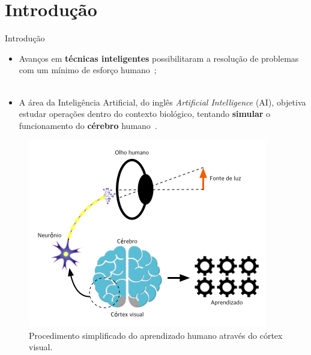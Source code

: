 \section{Introdução}
\label{s.introduction}

\begin{frame}{Introdução}
	\begin{itemize}
		\justifying
		\item Avanços em \textbf{técnicas inteligentes} possibilitaram a resolução de problemas com um mínimo de esforço humano~\cite{Lu:19};
		\\~\\
		\item A área da Inteligência Artificial, do inglês \emph{Artificial Intelligence} (AI), objetiva estudar operações dentro do contexto biológico, tentando \textbf{simular} o funcionamento do \textbf{cérebro} humano~\cite{Bishop:95}.
	\end{itemize}
\end{frame}

\begin{frame}
	\begin{figure}
		\centering
		\includegraphics[scale=0.5]{figs/visual_learning.png}	
		\caption{Procedimento simplificado do aprendizado humano através do córtex visual.}
		\label{f.visual_learning}
	\end{figure}
\end{frame}

